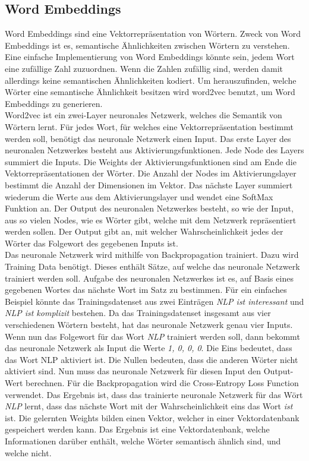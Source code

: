 \subsection{Word Embeddings}
\label{chap:word-embeddings}
Word Embeddings sind eine Vektorrepräsentation von Wörtern.
Zweck von Word Embeddings ist es, semantische Ähnlichkeiten zwischen Wörtern zu verstehen.
Eine einfache Implementierung von Word Embeddings könnte sein, jedem Wort eine zufällige Zahl zuzuordnen.
Wenn die Zahlen zufällig sind, werden damit allerdings keine semantischen Ähnlichkeiten kodiert.
Um herauszufinden, welche Wörter eine semantische Ähnlichkeit besitzen wird word2vec benutzt, um Word Embeddings zu generieren.\\

Word2vec ist ein zwei-Layer neuronales Netzwerk, welches die Semantik von Wörtern lernt.
Für jedes Wort, für welches eine Vektorrepräsentation bestimmt werden soll, benötigt das neuronale Netzwerk einen Input.
Das erste Layer des neuronalen Netzwerkes besteht aus Aktivierungsfunktionen.
Jede Node des Layers summiert die Inputs.
Die Weights der Aktivierungsfunktionen sind am Ende die Vektorrepräsentationen der Wörter.
Die Anzahl der Nodes im Aktivierungslayer bestimmt die Anzahl der Dimensionen im Vektor.
Das nächste Layer summiert wiederum die Werte aus dem Aktivierungslayer und wendet eine SoftMax Funktion an.
Der Output des neuronalen Netzwerkes besteht, so wie der Input, aus so vielen Nodes, wie es Wörter gibt, welche mit dem Netzwerk repräsentiert werden sollen.
Der Output gibt an, mit welcher Wahrscheinlichkeit jedes der Wörter das Folgewort des gegebenen Inputs ist.\\ 

Das neuronale Netzwerk wird mithilfe von Backpropagation trainiert.
Dazu wird Training Data benötigt.
Dieses enthält Sätze, auf welche das neuronale Netzwerk trainiert werden soll.
Aufgabe des neuronalen Netzwerkes ist es, auf Basis eines gegebenen Wortes das nächste Wort im Satz zu bestimmen.
Für ein einfaches Beispiel könnte das Trainingsdatenset aus zwei Einträgen \textit{NLP ist interessant} und \textit{NLP ist komplizit} bestehen.
Da das Trainingsdatenset insgesamt aus vier verschiedenen Wörtern besteht, hat das neuronale Netzwerk genau vier Inputs.
Wenn nun das Folgewort für das Wort \textit{NLP} trainiert werden soll, dann bekommt das neuronale Netzwerk als Input die Werte \textit{1, 0, 0, 0}.
Die Eins bedeutet, dass das Wort NLP aktiviert ist.
Die Nullen bedeuten, dass die anderen Wörter nicht aktiviert sind.
Nun muss das neuronale Netzwerk für diesen Input den Output-Wert berechnen.
Für die Backpropagation wird die Cross-Entropy Loss Function verwendet.
Das Ergebnis ist, dass das trainierte neuronale Netzwerk für das Wört \textit{NLP} lernt, dass das nächste Wort mit der Wahrscheinlichkeit eins das Wort \textit{ist} ist.
Die gelernten Weights bilden einen Vektor, welcher in einer Vektordatenbank gespeichert werden kann.
Das Ergebnis ist eine Vektordatenbank, welche Informationen darüber enthält, welche Wörter semantisch ähnlich sind, und welche nicht.

